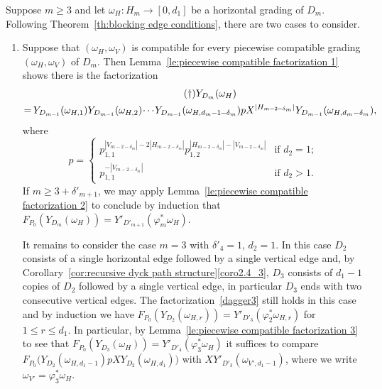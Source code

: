 \documentclass[ALCO,ThmDefs,Unicode,epreuves]{cedram}
\newcommand*{\mk}{\mkern -1mu}
\newcommand*{\Mk}{\mkern -2mu}
\begin{document}
Suppose $m\ge3$ and let $\omega_H:H_m\to[0,d_1]$ be a horizontal grading of $D_m$.
Following Theorem~\ref{th:blocking edge conditions}, there are two cases to consider.
\begin{enumerate}[label=(\alph*)]
 \item Suppose that $(\omega_H,\omega_V)$ is compatible for every piecewise compatible grading $(\omega_H,\omega_V)$ of $D_m$.
 Then Lemma~\ref{le:piecewise compatible factorization 1} shows there is the factorization
 \begin{multline}\label{dagger3}
 \tag{$\dagger$}
 Y_{D_m}(\omega_H)\\
 =\Mk Y_{D_{m\mk -\mk 1}}(\omega_{H,1})Y_{D_{m\mk -\mk 1}}(\omega_{H,2})\Mk\cdots\Mk Y_{D_{m\mk -\mk 1}}(\omega_{H,d_m\mk -\mk 1\mk -\mk \delta_m})pX^{|H_{m\mk -\mk 2\mk -\mk \delta_m}|} Y_{D_{m-1}}(\omega_{H,d_m-\delta_m}),
 \end{multline}
 where 
 \[p=\begin{cases} p_{1,1}^{|V_{m-2-\delta_m}|-2|H_{m-2-\delta_m}|}p_{1,2}^{|H_{m-2-\delta_m}|-|V_{m-2-\delta_m}|} & \text{if $d_2=1$;}\\ p_{1,1}^{-|V_{m-2-\delta_m}|} & \text{if $d_2>1$.}\end{cases}\]
 If $m\ge3+\delta'_{m+1}$, we may apply Lemma~\ref{le:piecewise compatible factorization 2} to conclude by induction that $F_{P_0}(Y_{D_m}(\omega_H))=Y'_{D'_{m+1}}(\varphi^*_m\omega_H)$.

 It remains to consider the case $m=3$ with $\delta'_4=1$, \ie $d_2=1$.
 In this case $D_2$ consists of a single horizontal edge followed by a single vertical edge and, by Corollary~\ref{cor:recursive dyck path structure}\ref{coro2.4_3}, $D_3$ consists of $d_1-1$ copies of $D_2$ followed by a single vertical edge, in particular $D_3$ ends with two consecutive vertical edges.
 The factorization~\eqref{dagger3} still holds in this case and by induction we have $F_{P_0}(Y_{D_2}(\omega_{H,r}))=Y'_{D'_3}(\varphi^*_2\omega_{H,r})$ for $1\le r\le d_1$.
 In particular, by Lemma~\ref{le:piecewise compatible factorization 3} to see that $F_{P_0}(Y_{D_3}(\omega_H))=Y'_{D'_4}(\varphi^*_3\omega_H)$ it suffices to compare $F_{P_0}\big(Y_{D_2}(\omega_{H,d_1-1})pXY_{D_2}(\omega_{H,d_1})\big)$ with $XY'_{D'_3}(\omega_{V',d_1-1})$, where we write $\omega_{V'}=\varphi^*_3\omega_H$.


\end{enumerate}
\end{document}
